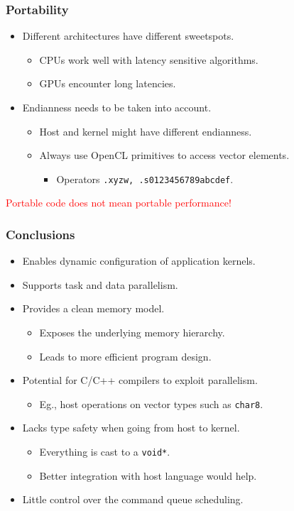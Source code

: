 \documentclass{beamer}
\newcommand{\code}[1]{\lstinline[basicstyle=\sffamily]{#1}}
\begin{document}
\begin{frame}
\frametitle{Portability}

  \begin{itemize}
  \item Different architectures have different sweetspots.
    \begin{itemize}
    \item CPUs work well with latency sensitive algorithms.
    \item GPUs encounter long latencies.
    \end{itemize}
  \item Endianness needs to be taken into account.
    \begin{itemize}
    \item Host and kernel might have different endianness.
    \item Always use OpenCL primitives to access vector elements.
      \begin{itemize}
      \item Operators \code{.xyzw, .s0123456789abcdef}.
      \end{itemize}
    \end{itemize}
  \end{itemize}
  \begin{center}
\textcolor{red}{Portable code does not mean portable performance!}
  \end{center}
  
\end{frame}

\begin{frame}
\frametitle{Conclusions}
  
  \begin{itemize}
  \item Enables dynamic configuration of application kernels.
  \item Supports task and data parallelism.
  \item Provides a clean memory model.
    \begin{itemize}
    \item Exposes the underlying memory hierarchy.
    \item Leads to more efficient program design.
    \end{itemize}
  \item Potential for C/C++ compilers to exploit parallelism.
    \begin{itemize}
    \item Eg., host operations on vector types such as \code{char8}.
    \end{itemize}
  \item Lacks type safety when going from host to kernel.
    \begin{itemize}
    \item Everything is cast to a \code{void*}.
    \item Better integration with host language would help.
    \end{itemize}
  \item Little control over the command queue scheduling.
  \end{itemize}
\end{frame}
\end{document}
